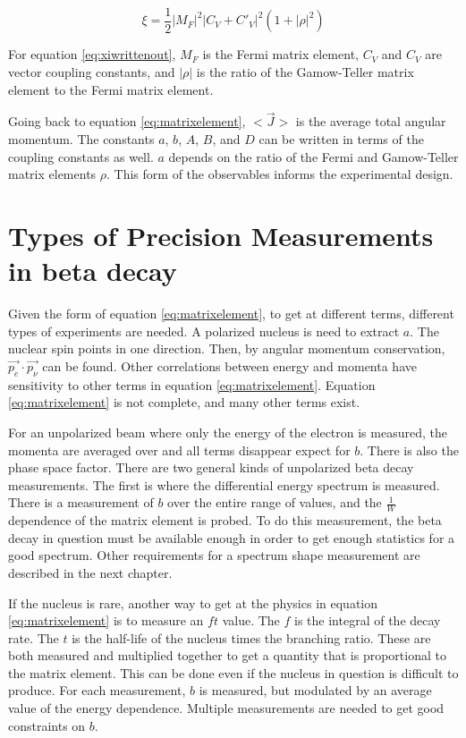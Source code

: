 \documentclass[../MaxHughesThesis.tex]{subfiles}
\begin{document}
\begin{equation}
	\xi = \frac{1}{2} |M_{F}|^{2} |C_{V} + C'_{V}|^{2} (1 + |\rho|^{2})
	\label{eq:xiwrittenout}
\end{equation}

For equation \ref{eq:xiwrittenout}, $M_{F}$ is the Fermi matrix element, $C_{V}$ and $C_{V}$ are vector coupling constants, and $|\rho|$ is the ratio of the Gamow-Teller matrix element to the Fermi matrix element.
\cite{Gon19}

Going back to equation \ref{eq:matrixelement}, $<\vec{J}>$ is the average total angular momentum. 
The constants $a$, $b$, $A$, $B$, and $D$ can be written in terms of the coupling constants as well.
$a$ depends on the ratio of the Fermi and Gamow-Teller matrix elements $\rho$.
This form of the observables informs the experimental design. 

\section{Types of Precision Measurements in beta decay}
Given the form of equation \ref{eq:matrixelement}, to get at different terms, different types of experiments are needed.
A polarized nucleus is need to extract $a$. 
The nuclear spin points in one direction. 
Then, by angular momentum conservation, $\vec{p_{e}} \cdot \vec{p_{\nu}}$ can be found.
Other correlations between energy and momenta have sensitivity to other terms in equation \ref{eq:matrixelement}.
Equation \ref{eq:matrixelement} is not complete, and many other terms exist. 

For an unpolarized beam where only the energy of the electron is measured, the momenta are averaged over and all terms disappear expect for $b$.
There is also the phase space factor.
There are two general kinds of unpolarized beta decay measurements.
The first is where the differential energy spectrum is measured.
There is a measurement of $b$ over the entire range of values, and the $\frac{1}{W}$ dependence of the matrix element is probed.
To do this measurement, the beta decay in question must be available enough in order to get enough statistics for a good spectrum.
Other requirements for a spectrum shape measurement are described in the next chapter.

If the nucleus is rare, another way to get at the physics in equation \ref{eq:matrixelement} is to measure an $ft$ value.
The $f$ is the integral of the decay rate.
The $t$ is the half-life of the nucleus times the branching ratio.
These are both measured and multiplied together to get a quantity that is proportional to the matrix element.
This can be done even if the nucleus in question is difficult to produce.
For each measurement, $b$ is measured, but modulated by an average value of the energy dependence.
Multiple measurements are needed to get good constraints on $b$.
\end{document}
